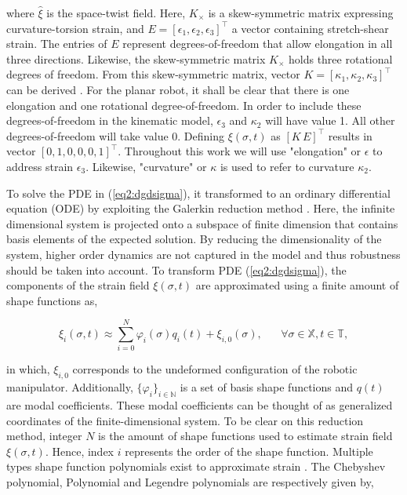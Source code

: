 where $\hat{\xi}$ is the space-twist field. Here, $K_\times$ is a skew-symmetric matrix expressing curvature-torsion strain, and $E = [\epsilon_1,\epsilon_2,\epsilon_3]^\top$ a vector containing stretch-shear strain. The entries of $E$ represent  degrees-of-freedom that allow elongation in all three directions. Likewise, the skew-symmetric matrix $K_{\times}$ holds three rotational degrees of freedom.  From this skew-symmetric matrix, vector $K = [\kappa_1,\kappa_2,\kappa_3]^\top$ can be derived \cite{Sola2018}. For the planar robot, it shall be clear that there is one elongation and one rotational degree-of-freedom. In order to include these degrees-of-freedom in the kinematic model, $\epsilon_3$ and $\kappa_2$ will have value 1. All other degrees-of-freedom will take value 0. Defining $\xi(\sigma,t)$ as $[K \hspace{2pt} E]^\top$ results in vector $[0,1,0,0,0,1]^\top$. Throughout this work we will use "elongation" or $\epsilon$ to address strain $\epsilon_3$. Likewise, "curvature" or $\kappa$ is used to refer to curvature $\kappa_2$.

To solve the PDE in (\ref{eq2:dgdsigma}), it transformed to an ordinary differential equation (ODE) by exploiting the Galerkin reduction method \cite{Galerkin}. Here, the infinite dimensional system is projected onto a subspace of finite dimension that contains basis elements of the expected solution. By reducing the dimensionality of the system, higher order dynamics are not captured in the model and thus robustness should be taken into account. To transform PDE (\ref{eq2:dgdsigma}), the components of the strain field $\xi(\sigma,t)$ are approximated using a finite amount of shape functions as,

\begin{equation}
    \xi_i(\sigma,t) \approx \sum_{i=0}^N \varphi_i(\sigma)q_i(t) + \xi_{i,0}(\sigma), \hspace{20pt} \forall \sigma \in \mathbb{X}, t \in \mathbb{T},
\end{equation}

in which, $\xi_{i,0}$ corresponds to the undeformed configuration of the robotic manipulator. Additionally, $\{\varphi_i\}_{i \in \mathbb{N}}$ is a set of basis shape functions and $q(t)$ are modal coefficients. These modal coefficients can be thought of as generalized coordinates of the finite-dimensional system. To be clear on this reduction method, integer $N$ is the amount of shape functions used to estimate strain field $\xi(\sigma,t)$. Hence, index $i$ represents the order of the shape function. Multiple types shape function polynomials exist to approximate strain \cite{Galerkin}. The Chebyshev polynomial, Polynomial and Legendre polynomials are respectively given by,

